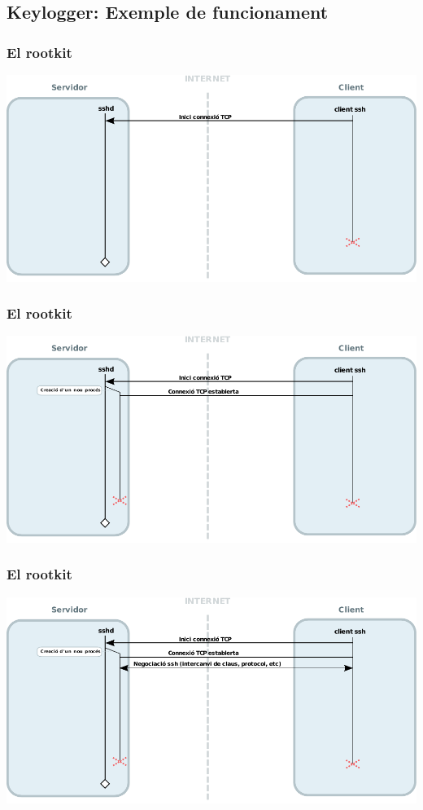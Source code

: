 \documentclass{beamer}
\begin{document}
\subsection*{Keylogger: Exemple de funcionament}
\begin{frame}
	\frametitle{El rootkit}
	\includegraphics[scale=0.65,keepaspectratio]{sshd_1.pdf}
\end{frame}

\begin{frame}
	\frametitle{El rootkit}
	\includegraphics[scale=0.65,keepaspectratio]{sshd_3.pdf}
\end{frame}

\begin{frame}
	\frametitle{El rootkit}
	\includegraphics[scale=0.65,keepaspectratio]{sshd_4.pdf}
\end{frame}
\end{document}
